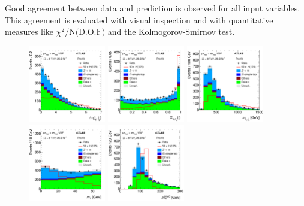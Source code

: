 Good agreement between data and prediction is observed for all input variables. This agreement is evaluated with visual inspection and with quantitative measures like $\chi^2/\text{N(D.O.F)}$ and the Kolmogorov-Smirnov test.

\clearpage

\begin{figure}[tp]
  \centering
  \includegraphics[width=0.30\textwidth]{figures/HIGG-2013-32/fig_02c}
  \includegraphics[width=0.30\textwidth]{figures/HIGG-2013-32/figaux_06a}
  \includegraphics[width=0.30\textwidth]{figures/HIGG-2013-32/figaux_06b}
  \includegraphics[width=0.30\textwidth]{figures/HIGG-2013-32/figaux_06c}
  \includegraphics[width=0.30\textwidth]{figures/HIGG-2013-32/figaux_06d}

\end{figure}
